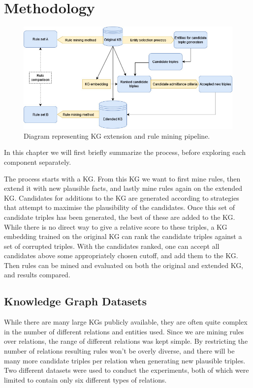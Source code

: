 \chapter{Methodology}

\begin{figure}[htp]
    \centering
    \includegraphics[width=16cm]{figures/ontology_mining_pipeline.jpg}
    \caption{Diagram representing KG extension and rule mining pipeline.}
\end{figure}

In this chapter we will first briefly summarize the process, before exploring each component separately.

The process starts with a KG. From this KG we want to first mine rules, then extend it with new plausible facts, and lastly mine rules again on the extended KG. Candidates for additions to the KG are generated according to strategies that attempt to maximise the plausibility of the candidates. Once this set of candidate triples has been generated, the best of these are added to the KG. While there is no direct way to give a relative score to these triples, a KG embedding trained on the original KG can rank the candidate triples against a set of corrupted triples. With the candidates ranked, one can accept all candidates above some appropriately chosen cutoff, and add them to the KG. Then rules can be mined and evaluated on both the original and extended KG, and results compared.

\section{Knowledge Graph Datasets}
While there are many large KGs publicly available, they are often quite complex in the number of different relations and entities used. Since we are mining rules over relations, the range of different relations was kept simple. By restricting the number of relations resulting rules won't be overly diverse, and there will be many more candidate triples per relation when generating new plausible triples. Two different datasets were used to conduct the experiments, both of which were limited to contain only six different types of relations.



